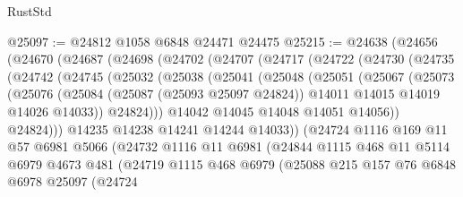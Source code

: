 \begin{lexlean}{RustStd}
\begin{coremodule}
@25097 := @24812 @1058 @6848 @24471 @24475
@25215 := @24638
    (@24656
      (@24670
        (@24687
          (@24698
            (@24702
              (@24707
                (@24717
                  (@24722
                    (@24730
                      (@24735
                        (@24742
                          (@24745
                            (@25032
                              (@25038
                                (@25041
                                  (@25048
                                    (@25051
                                      (@25067
                                        (@25073
                                          (@25076
                                            (@25084
                                              (@25087 (@25093 @25097 @24824))
                                              @14011
                                              @14015
                                              @14019
                                              @14026
                                              @14033))
                                          @24824)))
                                    @14042
                                    @14045
                                    @14048
                                    @14051
                                    @14056))
                                @24824)))
                          @14235
                          @14238
                          @14241
                          @14244
                          @14033))
                      (@24724
                        @1116
                        @169
                        @11
                        @57
                        @6981
                        @5066
                        (@24732
                          @1116
                          @11
                          @6981
                          (@24844
                            @1115
                            @468
                            @11
                            @5114
                            @6979
                            @4673
                            @481
                            (@24719
                              @1115
                              @468
                              @6979
                              (@25088
                                @215
                                @157
                                @76
                                @6848
                                @6978
                                @25097
                                (@24724

\end{coremodule}
\end{lexlean}

